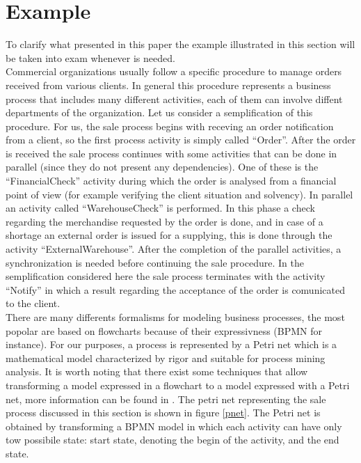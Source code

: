 \documentclass{llncs}
\begin{document}


\section{Example}\label{example}
To clarify what presented in this paper the example illustrated in this section will be taken into exam whenever is needed.\\

Commercial organizations usually follow a specific procedure to manage orders received from various clients. In general this procedure represents a business process that includes many different activities, each of them can involve diffent departments of the organization. Let us consider a semplification of this procedure. For us, the sale process begins with receving an order notification from a client, so the first process activity is simply called ``Order''. After the order is received the sale process continues with some activities that can be done in parallel (since they do not present any dependencies). One of these is the ``FinancialCheck'' activity during which the order is analysed from a financial point of view (for example verifying the client situation and solvency). In parallel an activity called ``WarehouseCheck'' is performed. In this phase a check regarding the merchandise requested by the order is done, and in case of a shortage an external order is issued for a supplying, this is done through the activity ``ExternalWarehouse''. After the completion of the  parallel activities, a synchronization is needed before continuing the sale procedure. In the semplification considered here the sale process terminates with the activity ``Notify'' in which a result regarding the acceptance of the order is comunicated to the client.\\

There are many differents formalisms for modeling business processes, the most popolar are based on flowcharts because of their expressivness (BPMN for instance). For our purposes, a process is represented by a Petri net which is a mathematical model characterized by rigor and suitable for process mining analysis. It is worth noting that there exist some techniques that allow transforming a model expressed in a flowchart to a model expressed with a Petri net, more information can be found in \cite{}. The petri net representing the sale process discussed in this section is shown in figure \ref{pnet}. The Petri net is obtained by transforming a BPMN model in which each activity can have only tow possibile state: start state, denoting the begin of the activity, and the end state.
\end{document}

